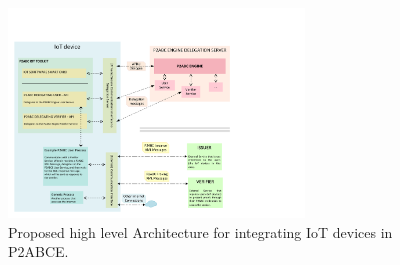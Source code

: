 \begin{figure}[htb!]
	\centering
	\includegraphics[width=0.7\textwidth]{gfx/P2ABCE-IoT-color}
	\caption{Proposed high level Architecture for integrating IoT devices in P2ABCE.}
	\label{fig:P2ABCE-IoT}
\end{figure}



